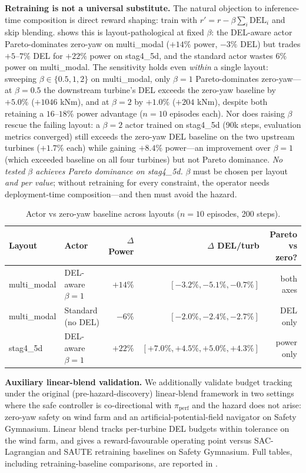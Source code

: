 \documentclass{article}
\begin{document}
\textbf{Retraining is not a universal substitute.}
The natural objection to inference-time composition is direct reward shaping: train with $r' = r - \beta\sum_i \mathrm{DEL}_i$ and skip blending.
 shows this is layout-pathological at fixed $\beta$: the DEL-aware actor Pareto-dominates zero-yaw on multi\_modal ($+14\%$ power, $-3\%$ DEL) but trades $+5$--$7\%$ DEL for $+22\%$ power on stag4\_5d, and the standard actor wastes $6\%$ power on multi\_modal.
The sensitivity holds even \emph{within} a single layout: sweeping $\beta\in\{0.5, 1, 2\}$ on multi\_modal, only $\beta=1$ Pareto-dominates zero-yaw---at $\beta=0.5$ the downstream turbine's DEL exceeds the zero-yaw baseline by $+5.0\%$ ($+1046$ kNm), and at $\beta=2$ by $+1.0\%$ ($+204$ kNm), despite both retaining a $16$--$18\%$ power advantage ($n=10$ episodes each).
Nor does raising $\beta$ rescue the failing layout: a $\beta=2$ actor trained on stag4\_5d (90k steps, evaluation metrics converged) still exceeds the zero-yaw DEL baseline on the two upstream turbines ($+1.7\%$ each) while gaining $+8.4\%$ power---an improvement over $\beta=1$ (which exceeded baseline on all four turbines) but not Pareto dominance.
\emph{No tested $\beta$ achieves Pareto dominance on stag4\_5d.}
$\beta$ must be chosen per layout \emph{and per value}; without retraining for every constraint, the operator needs deployment-time composition---and then must avoid the hazard.

\begin{table}[h]
\centering
\caption{Actor vs zero-yaw baseline across layouts ($n=10$ episodes, 200 steps).}
\label{tab:cross_layout_actor}
\small
\begin{tabular}{llrrr}
\toprule
Layout & Actor & $\Delta$ Power & $\Delta$ DEL/turb & Pareto vs zero? \\
\midrule
multi\_modal & DEL-aware $\beta\!=\!1$ & $+14\%$ & $[-3.2\%, -5.1\%, -0.7\%]$ & both axes \\
multi\_modal & Standard (no DEL) & $-6\%$ & $[-2.0\%, -2.4\%, -2.7\%]$ & DEL only \\
stag4\_5d & DEL-aware $\beta\!=\!1$ & $+22\%$ & $[+7.0\%, +4.5\%, +5.0\%, +4.3\%]$ & power only \\
\bottomrule
\end{tabular}
\end{table}

\textbf{Auxiliary linear-blend validation.}
We additionally validate budget tracking under the original (pre-hazard-discovery) linear-blend framework in two settings where the safe controller is co-directional with $\pi_{\mathrm{perf}}$ and the hazard does not arise: zero-yaw safety on wind farm and an artificial-potential-field navigator on Safety Gymnasium.
Linear blend tracks per-turbine DEL budgets within tolerance on the wind farm, and gives a reward-favourable operating point versus SAC-Lagrangian and SAUTE retraining baselines on Safety Gymnasium.
Full tables, including retraining-baseline comparisons, are reported in .
\end{document}
